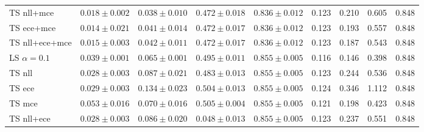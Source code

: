 \begin{table}[h!]
{\begin{tabular}{l|cccc|m{0.8cm}m{0.8cm}m{0.8cm}m{0.8cm}|}
			TS nll+mce & \multicolumn{1}{c|}{$0.018 \pm 0.002$} & \multicolumn{1}{c|}{$0.038 \pm 0.010$} &  \multicolumn{1}{c|}{$0.472 \pm 0.018$} & \multicolumn{1}{c|}{$0.836 \pm 0.012$} & \multicolumn{1}{c|}{0.123} & \multicolumn{1}{c|}{0.210} & \multicolumn{1}{c|}{0.605} & \multicolumn{1}{c|}{0.848} \\
			TS ece+mce & \multicolumn{1}{c|}{$0.014 \pm 0.021$} & \multicolumn{1}{c|}{$0.041 \pm 0.014$} & \multicolumn{1}{c|}{$0.472 \pm 0.017$} & \multicolumn{1}{c|}{$0.836 \pm 0.012$} & \multicolumn{1}{c|}{0.123} & \multicolumn{1}{c|}{0.193} & \multicolumn{1}{c|}{0.557} & \multicolumn{1}{c|}{0.848} \\
			TS nll+ece+mce & \multicolumn{1}{c|}{$0.015 \pm 0.003$} & \multicolumn{1}{c|}{$0.042 \pm 0.011$} & \multicolumn{1}{c|}{$0.472 \pm 0.017$} & \multicolumn{1}{c|}{$0.836 \pm 0.012$} & \multicolumn{1}{c|}{0.123} & \multicolumn{1}{c|}{0.187} & \multicolumn{1}{c|}{0.543} & \multicolumn{1}{c|}{0.848} \\\hline \hline
			LS $\alpha=0.1$ & \multicolumn{1}{c|}{$0.039 \pm 0.001$} & \multicolumn{1}{c|}{$0.065 \pm 0.001$} & \multicolumn{1}{c|}{$0.495 \pm 0.011$} & \multicolumn{1}{c|}{$0.855 \pm 0.005$} & \multicolumn{1}{c|}{0.116} & \multicolumn{1}{c|}{0.146} & \multicolumn{1}{c|}{0.398} & \multicolumn{1}{c|}{0.848} \\
			TS nll & \multicolumn{1}{c|}{$0.028 \pm 0.003$} & \multicolumn{1}{c|}{$0.087 \pm 0.021$} & \multicolumn{1}{c|}{$0.483 \pm 0.013$} & \multicolumn{1}{c|}{$0.855 \pm 0.005$} & \multicolumn{1}{c|}{0.123} & \multicolumn{1}{c|}{0.244} & \multicolumn{1}{c|}{0.536} & \multicolumn{1}{c|}{0.848} \\
			TS ece & \multicolumn{1}{c|}{$0.029 \pm 0.003$} & \multicolumn{1}{c|}{$0.134 \pm 0.023$} & \multicolumn{1}{c|}{$0.504 \pm 0.013$} & \multicolumn{1}{c|}{$0.855 \pm 0.005$} & \multicolumn{1}{c|}{0.124} & \multicolumn{1}{c|}{0.346} & \multicolumn{1}{c|}{1.112} & \multicolumn{1}{c|}{0.848} \\
			TS mce & \multicolumn{1}{c|}{$0.053 \pm 0.016$} & \multicolumn{1}{c|}{$0.070 \pm 0.016$} & \multicolumn{1}{c|}{$0.505 \pm 0.004$} & \multicolumn{1}{c|}{$0.855 \pm 0.005$} & \multicolumn{1}{c|}{0.121} & \multicolumn{1}{c|}{0.198} & \multicolumn{1}{c|}{0.423} & \multicolumn{1}{c|}{0.848} \\
			TS nll+ece & \multicolumn{1}{c|}{$0.028 \pm 0.003$} & \multicolumn{1}{c|}{$0.086 \pm 0.020$} & \multicolumn{1}{c|}{$0.048 \pm 0.013$} & \multicolumn{1}{c|}{$0.855 \pm 0.005$} & \multicolumn{1}{c|}{0.123} & \multicolumn{1}{c|}{0.237} & \multicolumn{1}{c|}{0.551} & \multicolumn{1}{c|}{0.848} \\

\end{tabular}}
\end{table}

